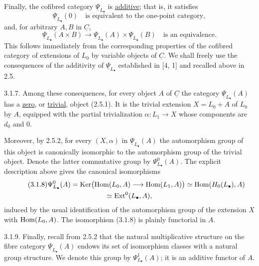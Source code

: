 Finally, the cofibred category $\underline\Psi_{L_\bullet}$ is
\underline{additive}; that is, it satisfies
\begin{equation}\tag{3.1.5}
 \underline\Psi_{L_\bullet}(0)
 \quad\text{is equivalent to the one-point category},
\end{equation}
and, for arbitrary $A,B$ in $\underline C$,
\begin{equation}\tag{3.1.6}
 \underline\Psi_{L_\bullet}(A\times B)
 \longrightarrow
 \underline\Psi_{L_\bullet}(A)\times
 \underline\Psi_{L_\bullet}(B)
 \quad\text{is an equivalence}.
\end{equation}
This follows immediately from the corresponding properties of the
cofibred category of extensions of $L_0$ by variable objects of
$\underline C$. We shall freely use the consequences of the
additivity of $\underline\Psi_{L_\bullet}$ established in [4, 1] and
recalled above in 2.5.

3.1.7. Among these consequences, for every object $A$ of
$\underline C$ the category $\underline\Psi_{L_\bullet}(A)$ has a
\underline{zero}, or \underline{trivial}, object (2.5.1). It is the
trivial extension $X=L_0+A$ of $L_0$ by $A$, equipped with the
partial trivialization $\alpha:L_1\longrightarrow X$ whose components
are $d_0$ and $0$.

Moreover, by 2.5.2, for every $(X,\alpha)$ in
$\underline\Psi_{L_\bullet}(A)$ the automorphism group of this object
is canonically isomorphic to the automorphism group of the trivial
object. Denote the latter commutative group by
$\Psi^0_{L_\bullet}(A)$. The explicit description above gives the
canonical isomorphisms
\begin{multline}\tag{3.1.8}
 \Psi^0_{L_\bullet}(A)
 =\operatorname{Ker}\bigl(\operatorname{Hom}(L_0,A)\longrightarrow\operatorname{Hom}(L_1,A)\bigr)
 \simeq\operatorname{Hom}(H_0(L_\bullet),A)\\
 \simeq\operatorname{Ext}^0(L_\bullet,A),
\end{multline}
induced by the usual identification of the automorphism group of the
extension $X$ with $\operatorname{Hom}(L_0,A)$. The isomorphism (3.1.8) is plainly
functorial in $A$.

3.1.9. Finally, recall from 2.5.2 that the natural multiplicative
structure on the fibre category $\underline\Psi_{L_\bullet}(A)$
endows its set of isomorphism classes with a natural group structure.
We denote this group by $\Psi^1_{L_\bullet}(A)$; it is an additive
functor of $A$.


